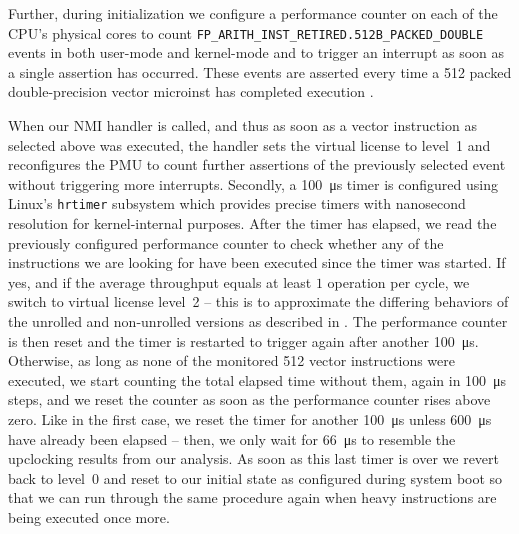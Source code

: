 Further, during initialization we configure a performance counter on each of the \gls{CPU}'s physical cores to count  \texttt{FP\_ARITH\_INST\_RETIRED.512B\_PACKED\_DOUBLE} events in both user-mode and kernel-mode and to trigger an interrupt as soon as a single assertion has occurred. These events are asserted every time a \SI{512}{\bit} packed double-precision vector \gls{microinst} has completed execution \cite{intelsdmsysprogguide}.

When our \gls{NMI} handler is called, and thus as soon as a vector instruction as selected above was executed, the handler sets the virtual license to level~1 and reconfigures the \gls{PMU} to count further assertions of the previously selected event without triggering more interrupts. Secondly, a \SI{100}{\micro\second} timer is configured using \gls{Linux}'s \texttt{hrtimer} subsystem which provides precise timers with nanosecond resolution for kernel-internal purposes. After the timer has elapsed, we read the previously configured performance counter to check whether any of the instructions we are looking for have been executed since the timer was started. If yes, and if the average throughput equals at least $1$ operation per cycle, we switch to virtual license level~2 -- this is to approximate the differing behaviors of the unrolled and non-unrolled versions as described in . The performance counter is then reset and the timer is restarted to trigger again after another \SI{100}{\micro\second}. Otherwise, as long as none of the monitored \SI[number-unit-product=-]{512}{\bit} vector instructions were executed, we start counting the total elapsed time without them, again in \SI{100}{\micro\second} steps, and we reset the counter as soon as the performance counter rises above zero. Like in the first case, we reset the timer for another \SI{100}{\micro\second} unless \SI{600}{\micro\second} have already been elapsed -- then, we only wait for \SI{66}{\micro\second} to resemble the upclocking results from our analysis. As soon as this last timer is over we revert back to level~0 and reset to our initial state as configured during system boot so that we can run through the same procedure again when heavy instructions are being executed once more.

